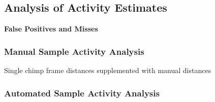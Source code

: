 \subsection{Analysis of Activity Estimates}

\vspace{5mm}
\textbf{False Positives and Misses}

\subsubsection{Manual Sample Activity Analysis}
Single chimp frame distances supplemented with manual distances

\subsubsection{Automated Sample Activity Analysis}
